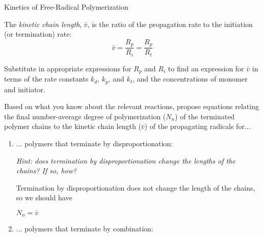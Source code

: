 \begin{activity}{Kinetics of Free-Radical Polymerization}
\begin{ctqs}
\end{ctqs}

\begin{infobox}\label{\labelbase:infobox:kineticchainlength}
	The \emph{kinetic chain length}, $\bar v$, is the ratio of the propagation rate to the initiation (or termination) rate:
	\begin{equation*}
		\bar v = \frac{R_p}{R_i} = \frac{R_p}{R_t}
	\end{equation*}
\end{infobox}

\begin{ctqs}

	\question Substitute in appropriate expressions for $R_p$ and $R_i$ to find an expression for $\bar v$ in terms of the rate constants $k_d$, $k_p$, and $k_t$, and the concentrations of monomer and initiator.
	
		\begin{solution}[2.5in]\end{solution}
		
	\question Based on what you know about the relevant reactions, propose equations relating the final number-average degree of polymerization ($N_n$) of the terminated polymer chains to the kinetic chain length ($\bar v$) of the propagating radicals for...
		
		\begin{enumerate}
		
			\item ... polymers that terminate by disproportionation:
			
				\emph{Hint: does termination by disproportionation change the lengths of the chains?  If so, how?}
				
				\begin{solution}[0.75in]
					Termination by disproportionation does not change the length of the chains, so we should have 
					
					$N_n = \bar v$
				\end{solution}
			
			\item ... polymers that terminate by combination:
			

\end{enumerate}
\end{ctqs}
\end{activity}
